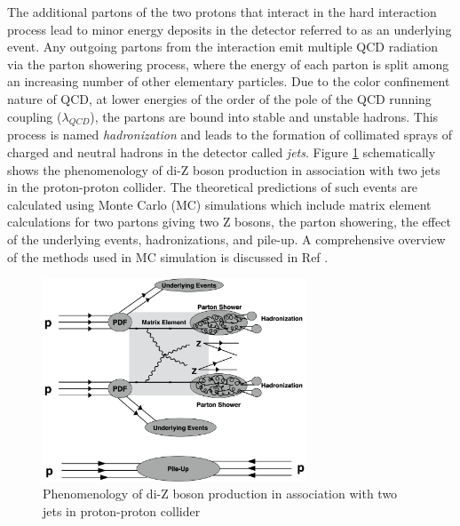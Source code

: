 The additional partons of the two protons that interact in the hard interaction process lead to minor energy deposits in the detector referred to as an underlying event. Any outgoing partons from the interaction emit multiple QCD radiation via the parton showering process, where the energy of each parton is split among an increasing number of other elementary particles. Due to the color confinement nature of QCD, at lower energies of the order of the pole of the QCD running coupling ($\lambda_{QCD}$), the partons are bound into stable and unstable hadrons. This process is named \textit{hadronization} and leads to the formation of collimated sprays of charged and neutral hadrons in the detector called \textit{jets}. Figure \ref{fig:ColliderPheno} schematically shows the phenomenology of di-Z boson production in association with two jets in the proton-proton collider. The theoretical predictions of such events are calculated using Monte Carlo (MC) simulations which include matrix element calculations for two partons giving two Z bosons, the parton showering, the effect of the underlying events, hadronizations, and pile-up. A comprehensive overview of the methods used in MC simulation is discussed in Ref \cite{EventGenerator}.  

\begin{figure}[!htb]
\centering
    \includegraphics[width=0.7\textwidth] {figures/Theory/ColliderPheno.pdf}\hspace{1cm}
    \caption{Phenomenology of di-Z boson production in association with two jets in proton-proton collider}
\label{fig:ColliderPheno}
\end{figure}

